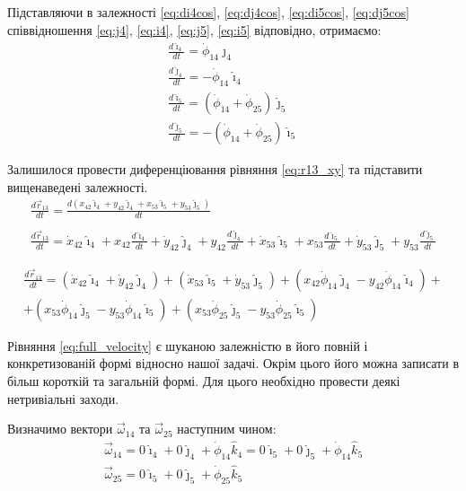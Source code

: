 \documentclass[12pt]{article}
\begin{document}
 	Підставляючи в залежності \ref{eq:di4cos}, \ref{eq:dj4cos}, \ref{eq:di5cos}, \ref{eq:dj5cos} співвідношення \ref{eq:j4}, \ref{eq:i4}, \ref{eq:j5}, \ref{eq:i5} відповідно, отримаємо:
 	\begin{gather}
 	\frac {d \hat{\imath}_{4}} {dt} =\dot{\phi}_{14} \hat{\jmath}_{4}\\
 	\frac {d \hat{\jmath}_{4}} {dt} = - \dot{\phi}_{14} \hat{\imath}_{4}\\
 	\frac {d \hat{\imath}_{5}} {dt} =(\dot{\phi}_{14} + \dot{\phi}_{25}) \hat{\jmath}_{5}\\
 	\frac {d \hat{\jmath}_{5}} {dt} =-(\dot{\phi}_{14} + \dot{\phi}_{25}) \hat{\imath}_{5}
 	\end{gather}
 	
 	Залишилося провести диференціювання рівняння \ref {eq:r13_xy} та підставити вищенаведені залежності.
 	\begin{gather*}
 	\frac{d\vec{r}_{13}}{d t} = \frac{d(x_{42} \hat{\imath}_{4} + y_{42} \hat{\jmath}_{4} + x_{53} \hat{\imath}_{5} + y_{53} \hat{\jmath}_{5})}{d t} \\
 	\\
 	\frac{d\vec{r}_{13}}{d t} = \dot{x}_{42} \hat{\imath}_{4} + x_{42} \frac {d \hat{\imath}_{4}} {dt} + \dot{y}_{42} \hat{\jmath}_{4} + y_{42} \frac {d \hat{\jmath}_{4}} {dt} + \dot{x}_{53} \hat{\imath}_{5} + x_{53} \frac {d \hat{\imath}_{5}} {dt} + \dot{y}_{53} \hat{\jmath}_{5} + y_{53} \frac {d \hat{\jmath}_{5}} {dt}
 	\end{gather*}
 	
 	\begin{multline} 
 	\label {eq:full_velocity}	
 		\frac{d\vec{r}_{13}}{d t} = (\dot{x}_{42} \hat{\imath}_{4} + \dot{y}_{42} \hat{\jmath}_{4}) + (\dot{x}_{53} \hat{\imath}_{5} + \dot{y}_{53} \hat{\jmath}_{5}) + (x_{42} \dot{\phi}_{14} \hat{\jmath}_{4} - y_{42} \dot{\phi}_{14} \hat{\imath}_{4}) +\\+  (x_{53} \dot{\phi}_{14} \hat{\jmath}_{5} -  y_{53} \dot{\phi}_{14} \hat{\imath}_{5}) + (x_{53} \dot{\phi}_{25} \hat{\jmath}_{5} -  y_{53} \dot{\phi}_{25} \hat{\imath}_{5})
 	\end{multline}
 	
 	Рівняння \ref{eq:full_velocity} є шуканою залежністю в його повній і конкретизованій формі відносно нашої задачі. Окрім цього його можна записати в більш короткій та загальній формі. Для цього необхідно провести деякі нетривіальні заходи.
 	
 	Визначимо вектори $\vec{\omega}_{14}$ та $\vec{\omega}_{25}$ наступним чином:
 	\begin{gather}
 	\vec{\omega}_{14} = 0\hat{\imath}_{4} +0\hat{\jmath}_{4} + \dot{\phi}_{14} \hat{k}_4 = 0\hat{\imath}_{5} +0\hat{\jmath}_{5} + \dot{\phi}_{14} \hat{k}_5 \\
 	\vec{\omega}_{25} = 0\hat{\imath}_{5} +0\hat{\jmath}_{5} + \dot{\phi}_{25} \hat{k}_5
 	\end{gather}
 	
\end{document}
